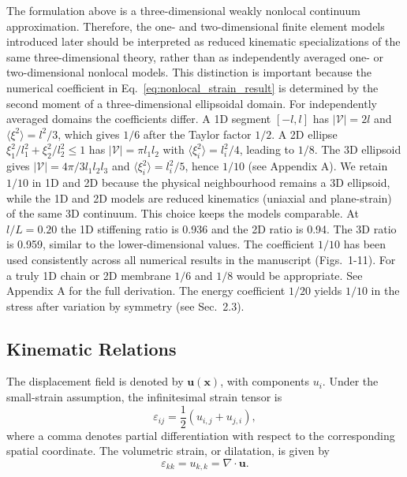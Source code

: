 \documentclass[final,3p,times,fleqn]{elsarticle}
\newcommand{\rev}[1]{\textcolor{revcolor}{#1}}
\begin{document}
The formulation above is a three-dimensional weakly nonlocal continuum
approximation. Therefore, the one- and two-dimensional finite element
models introduced later should be interpreted as reduced kinematic
specializations of the same three-dimensional theory, rather than as
independently averaged one- or two-dimensional nonlocal models. This
distinction is important because the numerical coefficient in
Eq.~\eqref{eq:nonlocal_strain_result} is determined by the second
moment of a three-dimensional ellipsoidal domain.
\rev{For independently averaged domains the coefficients differ. A 1D segment $[-l,l]$ has $|\mathcal{V}|=2l$ and $\langle\xi^2\rangle=l^2/3$, which gives $1/6$ after the Taylor factor $1/2$. A 2D ellipse $\xi_1^2/l_1^2+\xi_2^2/l_2^2\le1$ has $|\mathcal{V}|=\pi l_1l_2$ with $\langle\xi_i^2\rangle=l_i^2/4$, leading to $1/8$. The 3D ellipsoid gives $|\mathcal{V}|=4\pi/3 l_1l_2l_3$ and $\langle\xi_i^2\rangle=l_i^2/5$, hence $1/10$ (see Appendix A). We retain $1/10$ in 1D and 2D because the physical neighbourhood remains a 3D ellipsoid, while the 1D and 2D models are reduced kinematics (uniaxial and plane-strain) of the same 3D continuum. This choice keeps the models comparable. At $l/L=0.20$ the 1D stiffening ratio is 0.936 and the 2D ratio is 0.94. The 3D ratio is 0.959, similar to the lower-dimensional values. The coefficient $1/10$ has been used consistently across all numerical results in the manuscript (Figs.~1-11). For a truly 1D chain or 2D membrane $1/6$ and $1/8$ would be appropriate. See Appendix A for the full derivation. The energy coefficient $1/20$ yields $1/10$ in the stress after variation by symmetry (see Sec.~2.3).}

\subsection{Kinematic Relations}

The displacement field is denoted by $\mathbf{u}(\mathbf{x})$, with
components $u_i$. Under the small-strain assumption, the infinitesimal
strain tensor is
\begin{equation}\label{eq:kinematic}
\varepsilon_{ij}
=
\frac{1}{2}\left(u_{i,j}+u_{j,i}\right),
\end{equation}
where a comma denotes partial differentiation with respect to the
corresponding spatial coordinate. The volumetric strain, or dilatation,
is given by
\begin{equation}\label{eq:dilatation}
\varepsilon_{kk}
=
u_{k,k}
=
\nabla\cdot\mathbf{u}.
\end{equation}
\end{document}
